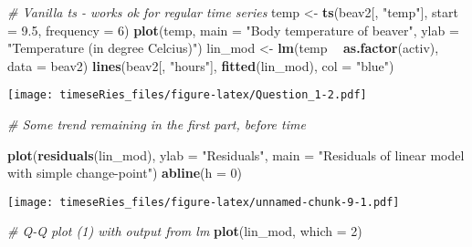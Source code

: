 \documentclass[]{book}
\newenvironment{Shaded}{\begin{snugshade}}{\end{snugshade}}
\newcommand{\CommentTok}[1]{\textcolor[rgb]{0.56,0.35,0.01}{\textit{#1}}}
\newcommand{\DataTypeTok}[1]{\textcolor[rgb]{0.13,0.29,0.53}{#1}}
\newcommand{\DecValTok}[1]{\textcolor[rgb]{0.00,0.00,0.81}{#1}}
\newcommand{\FloatTok}[1]{\textcolor[rgb]{0.00,0.00,0.81}{#1}}
\newcommand{\KeywordTok}[1]{\textcolor[rgb]{0.13,0.29,0.53}{\textbf{#1}}}
\newcommand{\NormalTok}[1]{#1}
\newcommand{\OperatorTok}[1]{\textcolor[rgb]{0.81,0.36,0.00}{\textbf{#1}}}
\newcommand{\StringTok}[1]{\textcolor[rgb]{0.31,0.60,0.02}{#1}}
\begin{document}
\begin{Shaded}
\begin{Highlighting}[]
\CommentTok{# Vanilla ts - works ok for regular time series}
\NormalTok{temp <-}\StringTok{ }\KeywordTok{ts}\NormalTok{(beav2[, }\StringTok{"temp"}\NormalTok{], }\DataTypeTok{start =} \FloatTok{9.5}\NormalTok{, }\DataTypeTok{frequency =} \DecValTok{6}\NormalTok{)}
\KeywordTok{plot}\NormalTok{(temp, }\DataTypeTok{main =} \StringTok{"Body temperature of beaver"}\NormalTok{, }\DataTypeTok{ylab =} \StringTok{"Temperature (in degree Celcius)"}\NormalTok{)}
\NormalTok{lin_mod <-}\StringTok{ }\KeywordTok{lm}\NormalTok{(temp }\OperatorTok{~}\StringTok{ }\KeywordTok{as.factor}\NormalTok{(activ), }\DataTypeTok{data =}\NormalTok{ beav2)}
\KeywordTok{lines}\NormalTok{(beav2[, }\StringTok{"hours"}\NormalTok{], }\KeywordTok{fitted}\NormalTok{(lin_mod), }\DataTypeTok{col =} \StringTok{"blue"}\NormalTok{)}
\end{Highlighting}
\end{Shaded}

\texttt{[image: timeseRies\_files/figure-latex/Question\_1-2.pdf]}

\begin{Shaded}
\begin{Highlighting}[]
\CommentTok{# Some trend remaining in the first part, before time}
\end{Highlighting}
\end{Shaded}

\begin{Shaded}
\begin{Highlighting}[]
\KeywordTok{plot}\NormalTok{(}\KeywordTok{residuals}\NormalTok{(lin_mod), }\DataTypeTok{ylab =} \StringTok{"Residuals"}\NormalTok{, }\DataTypeTok{main =} \StringTok{"Residuals of linear model with simple change-point"}\NormalTok{)}
\KeywordTok{abline}\NormalTok{(}\DataTypeTok{h =} \DecValTok{0}\NormalTok{)}
\end{Highlighting}
\end{Shaded}

\texttt{[image: timeseRies\_files/figure-latex/unnamed-chunk-9-1.pdf]}

\begin{Shaded}
\begin{Highlighting}[]
\CommentTok{# Q-Q plot (1) with output from lm}
\KeywordTok{plot}\NormalTok{(lin_mod, }\DataTypeTok{which =} \DecValTok{2}\NormalTok{)}
\end{Highlighting}
\end{Shaded}
\end{document}
